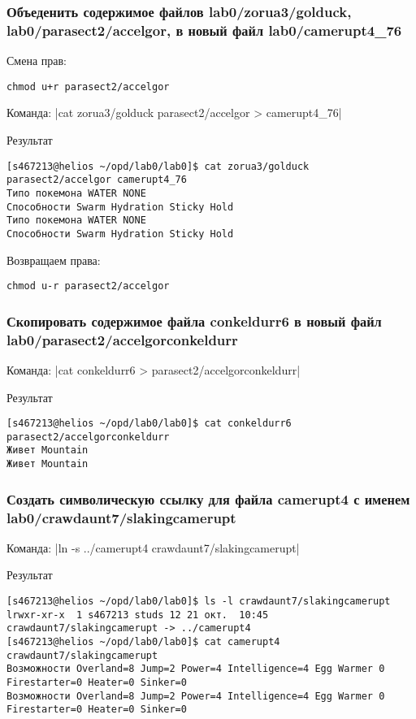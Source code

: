 \subsubsection*{Объеденить содержимое файлов lab0/zorua3/golduck, lab0/parasect2/accelgor, в новый файл lab0/camerupt4\_76}

Смена прав: 
\begin{verbatim}
chmod u+r parasect2/accelgor
\end{verbatim}

Команда: |cat zorua3/golduck parasect2/accelgor > camerupt4_76|

Результат
\begin{verbatim}
[s467213@helios ~/opd/lab0/lab0]$ cat zorua3/golduck parasect2/accelgor camerupt4_76
Типо покемона WATER NONE
Способности Swarm Hydration Sticky Hold
Типо покемона WATER NONE
Способности Swarm Hydration Sticky Hold
\end{verbatim}

Возвращаем права:
\begin{verbatim}
chmod u-r parasect2/accelgor
\end{verbatim}


\subsubsection*{Скопировать содержимое файла conkeldurr6 в новый файл lab0/parasect2/accelgorconkeldurr}
Команда: |cat conkeldurr6 > parasect2/accelgorconkeldurr|

Результат
\begin{verbatim}
[s467213@helios ~/opd/lab0/lab0]$ cat conkeldurr6 parasect2/accelgorconkeldurr
Живет Mountain
Живет Mountain
\end{verbatim}

\subsubsection*{Создать символическую ссылку для файла camerupt4 с именем lab0/crawdaunt7/slakingcamerupt}
Команда: |ln -s ../camerupt4 crawdaunt7/slakingcamerupt|

Результат
\begin{verbatim}
[s467213@helios ~/opd/lab0/lab0]$ ls -l crawdaunt7/slakingcamerupt
lrwxr-xr-x  1 s467213 studs 12 21 окт.  10:45 crawdaunt7/slakingcamerupt -> ../camerupt4
[s467213@helios ~/opd/lab0/lab0]$ cat camerupt4 crawdaunt7/slakingcamerupt
Возможности Overland=8 Jump=2 Power=4 Intelligence=4 Egg Warmer 0 Firestarter=0 Heater=0 Sinker=0
Возможности Overland=8 Jump=2 Power=4 Intelligence=4 Egg Warmer 0 Firestarter=0 Heater=0 Sinker=0
\end{verbatim}
